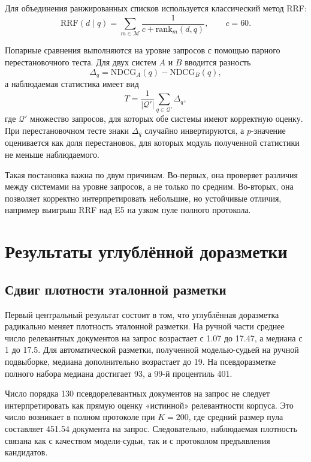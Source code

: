 \documentclass[runningheads,a4paper]{llncs}
\begin{document}
Для объединения ранжированных списков используется классический метод RRF:
\begin{equation}
\label{eq:rrf}
\mathrm{RRF}(d \mid q) = \sum_{m \in \mathcal{M}} \frac{1}{c + \mathrm{rank}_m(d,q)}, \qquad c = 60.
\end{equation}

Попарные сравнения выполняются на уровне запросов с помощью парного перестановочного теста. Для двух систем $A$ и $B$ вводится разность
\begin{equation}
\label{eq:delta}
\Delta_q = \mathrm{NDCG}_A(q) - \mathrm{NDCG}_B(q),
\end{equation}
а наблюдаемая статистика имеет вид
\begin{equation}
\label{eq:perm}
T = \frac{1}{|\mathcal{Q}'|} \sum_{q \in \mathcal{Q}'} \Delta_q,
\end{equation}
где $\mathcal{Q}'$ \textemdash{} множество запросов, для которых обе системы имеют корректную оценку. При перестановочном тесте знаки $\Delta_q$ случайно инвертируются, а $p$-значение оценивается как доля перестановок, для которых модуль полученной статистики не меньше наблюдаемого.

Такая постановка важна по двум причинам. Во-первых, она проверяет различия между системами на уровне запросов, а не только по средним. Во-вторых, она позволяет корректно интерпретировать небольшие, но устойчивые отличия, например выигрыш RRF над E5 на узком пуле полного протокола.

\section{Результаты углублённой доразметки}

\subsection{Сдвиг плотности эталонной разметки}

Первый центральный результат состоит в том, что углублённая доразметка радикально меняет плотность эталонной разметки. На ручной части среднее число релевантных документов на запрос возрастает с 1.07 до 17.47, а медиана \textemdash{} с 1 до 17.5. Для автоматической разметки, полученной моделью-судьей на ручной подвыборке, медиана дополнительно возрастает до 19. На псевдоразметке полного набора медиана достигает 93, а 99-й процентиль \textemdash{} 401.

Число порядка 130 псевдорелевантных документов на запрос не следует интерпретировать как прямую оценку «истинной» релевантности корпуса. Это число возникает в полном протоколе при $K=200$, где средний размер пула составляет 451.54 документа на запрос. Следовательно, наблюдаемая плотность связана как с качеством модели-судьи, так и с протоколом предъявления кандидатов.
\end{document}

